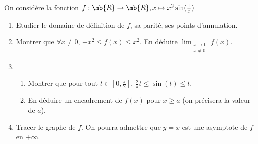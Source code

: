 \exercice

On considère la fonction $f : \mb{R} \rightarrow \mb{R}, x \mapsto x^2 \sin(\frac{1}{x})$

\begin{enumerate}

\item Etudier le domaine de définition de $f$, sa parité, ses points d'annulation.

\item Montrer que $\forall x \neq 0$, $-x^2 \le f(x) \le x^2$. En déduire $\displaystyle \lim_{\substack{x \rightarrow 0\\x \neq 0}} f(x)$.

\item \begin{enumerate}

\item Montrer que pour tout $t\in [0,\frac{\pi}{2}]$, $\frac{2}{\pi}t \le \sin(t) \le t$.

\item En déduire un encadrement de $f(x)$ pour $x \ge a$ (on précisera la valeur de $a$).

\end{enumerate}

\item Tracer le graphe de $f$. On pourra admettre que $y =x$ est une asymptote de $f$ en $+ \infty$.
\end{enumerate}


